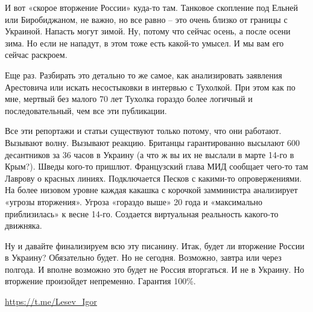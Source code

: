 И вот «скорое вторжение России» куда-то там. Танковое скопление под Ельней или
Биробиджаном, не важно, но все равно – это очень близко от границы с Украиной.
Напасть могут зимой. Ну, потому что сейчас осень, а после осени зима. Но если
не нападут, в этом тоже есть какой-то умысел. И мы вам его сейчас раскроем.

Еще раз. Разбирать это детально то же самое, как анализировать заявления
Арестовича или искать несостыковки в интервью с Тухолкой. При этом как по мне,
мертвый без малого 70 лет Тухолка гораздо более логичный и последовательный,
чем все эти публикации.

Все эти репортажи и статьи существуют только потому, что они работают. Вызывают
волну. Вызывают реакцию. Британцы гарантированно высылают 600 десантников за 36
часов в Украину (а что ж вы их не выслали в марте 14-го в Крым?). Шведы кого-то
пришлют. Французский глава МИД сообщает чего-то там Лаврову о красных линиях.
Подключается Песков с какими-то опровержениями. На более низовом уровне каждая
какашка с корочкой замминистра анализирует «угрозы вторжения». Угроза «гораздо
выше» 20 года и «максимально приблизилась» к весне 14-го. Создается виртуальная
реальность какого-то движняка.

Ну и давайте финализируем всю эту писанину. Итак, будет ли вторжение России в
Украину? Обязательно будет. Но не сегодня. Возможно, завтра или через полгода.
И вполне возможно это будет не Россия вторгаться. И не в Украину. Но вторжение
произойдет непременно. Гарантия 100\%.

\url{https://t.me/Lesev_Igor}
